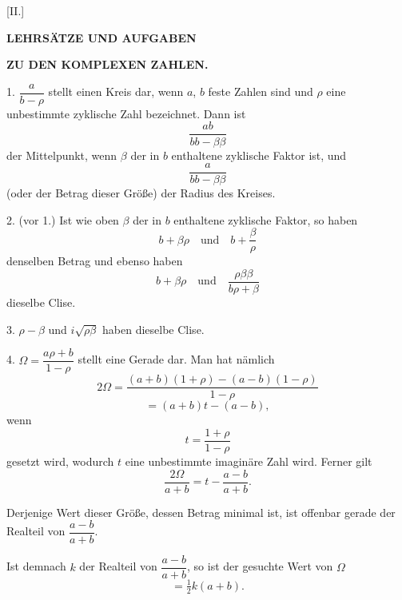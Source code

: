 
\begin{center}
[II.]

\textbf{LEHRSÄTZE UND AUFGABEN}

\textbf{ZU DEN KOMPLEXEN ZAHLEN.}
\end{center}

1. $\dfrac{a}{b-\rho}$ stellt einen Kreis dar, wenn $a$, $b$ feste Zahlen sind und $\rho$ eine
unbestimmte zyklische Zahl bezeichnet. Dann ist
\[
\dfrac{ab}{bb-\beta\beta}
\]
der Mittelpunkt, wenn $\beta$ der in $b$ enthaltene zyklische Faktor ist, und
\[
\dfrac{a}{bb-\beta\beta}
\]
(oder der Betrag dieser Größe) der Radius des Kreises.

2. (vor 1.) Ist wie oben $\beta$ der in $b$ enthaltene zyklische Faktor, so haben
\[
b + \beta\rho \quad \text{und} \quad b + \dfrac{\beta}{\rho}
\]
denselben Betrag und ebenso haben
\[
b + \beta\rho \quad \text{und} \quad \dfrac{\rho\beta\beta}{b\rho+\beta}
\]
dieselbe Clise.

3. $\rho - \beta$ und $i\sqrt{\rho\beta}$ haben dieselbe Clise.

4. $\Omega = \dfrac{a\rho+b}{1-\rho}$ stellt eine Gerade dar. Man hat
nämlich
\[
2\Omega = \dfrac{(a+b)(1+\rho) - (a-b)(1-\rho)}{1-\rho}
\]
\[
= (a+b)t - (a-b),
\]
wenn
\[
t = \dfrac{1+\rho}{1-\rho}
\]
gesetzt wird, wodurch $t$ eine unbestimmte imaginäre Zahl wird. Ferner gilt
\[
\dfrac{2\Omega}{a+b} = t - \dfrac{a-b}{a+b}.
\]

Derjenige Wert dieser Größe, dessen Betrag minimal ist, ist offenbar
gerade der Realteil von $\dfrac{a-b}{a+b}$.

Ist demnach $k$ der Realteil von $\dfrac{a-b}{a+b}$, so ist der
gesuchte Wert von $\Omega$
\[
= \tfrac{1}{2} k (a+b).
\]

